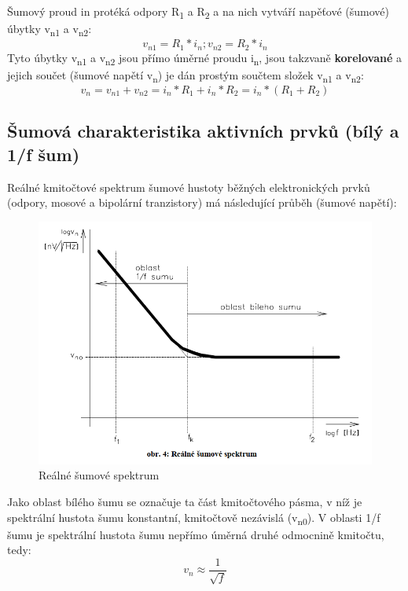 Šumový proud in protéká odpory R\textsubscript{1} a R\textsubscript{2} a na nich vytváří napěťové (šumové) úbytky v\textsubscript{n1} a v\textsubscript{n2}:
\begin{equation}
v_{n1} = R_{1}*i_{n};v_{n2}=R_{2}*i_{n}
\end{equation}
Tyto úbytky v\textsubscript{n1} a v\textsubscript{n2} jsou přímo úměrné proudu i\textsubscript{n}, jsou takzvaně \textbf{korelované} a jejich součet (šumové napětí v\textsubscript{n}) je dán prostým součtem složek v\textsubscript{n1} a v\textsubscript{n2}:
\begin{equation}
v_{n} = v_{n1}+v_{n2}=i_{n}*R_{1}+i_{n}*R_{2}=i_{n}*(R_{1}+R_{2})
\end{equation}

\subsection{Šumová charakteristika aktivních prvků (bílý a 1/f šum)}
Reálné kmitočtové spektrum šumové hustoty běžných elektronických prvků (odpory, mosové a bipolární tranzistory) má následující průběh (šumové napětí):
\begin{figure}[h]
   \begin{center}
     \includegraphics[scale=0.5]{images/realsum.png}
   \end{center}
   \caption{Reálné šumové spektrum}
\end{figure}

Jako oblast bílého šumu se označuje ta část kmitočtového pásma, v níž je spektrální hustota šumu konstantní, kmitočtově nezávislá (v\textsubscript{n0}). V oblasti 1/f šumu je spektrální hustota šumu nepřímo úměrná druhé odmocnině kmitočtu, tedy: 
\begin{equation}
v_{n} \approx \frac{1}{\sqrt{f}}
\end{equation}

